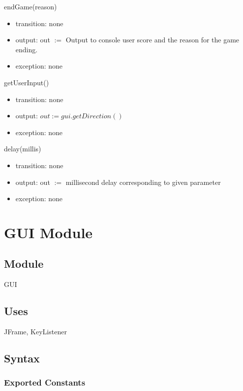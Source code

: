 \documentclass[12pt]{article}
\begin{document}
\noindent endGame(reason)
\begin{itemize}
    \item transition: none
    \item output: out $:=$ Output to console user score and the reason for the game ending.
    \item exception: none
\end{itemize}

\noindent getUserInput()
\begin{itemize}
    \item transition: none
    \item output: $out := gui.getDirection()$
    \item exception: none
\end{itemize}

\noindent delay(millis)
\begin{itemize}
    \item transition: none
    \item output: out $:=$ millisecond delay corresponding to given parameter
    \item exception: none
\end{itemize}

\newpage


\section* {GUI Module}

\subsection*{Module}

GUI

\subsection* {Uses}

JFrame, KeyListener

\subsection* {Syntax}

\subsubsection* {Exported Constants}
\end{document}

